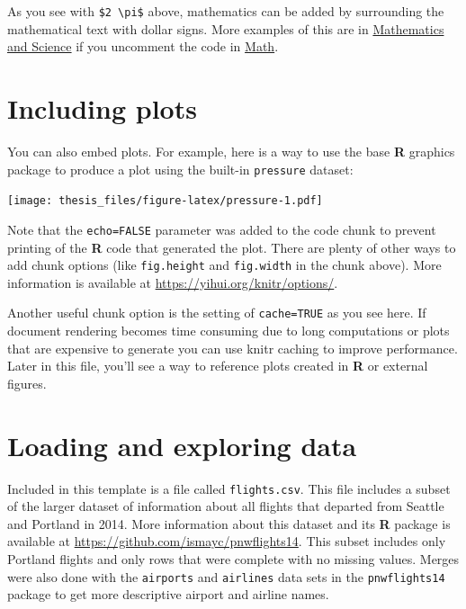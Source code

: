\documentclass[12pt,twoside]{reedthesis}
\begin{document}
As you see with \texttt{\$2\ \textbackslash{}pi\$} above, mathematics can be added by surrounding the mathematical text with dollar signs. More examples of this are in \protect\hyperlink{math-sci}{Mathematics and Science} if you uncomment the code in \protect\hyperlink{math}{Math}.

\hypertarget{including-plots}{%
\section{Including plots}\label{including-plots}}

You can also embed plots. For example, here is a way to use the base \textbf{R} graphics package to produce a plot using the built-in \texttt{pressure} dataset:

\texttt{[image: thesis\_files/figure-latex/pressure-1.pdf]}

Note that the \texttt{echo=FALSE} parameter was added to the code chunk to prevent printing of the \textbf{R} code that generated the plot. There are plenty of other ways to add chunk options (like \texttt{fig.height} and \texttt{fig.width} in the chunk above). More information is available at \url{https://yihui.org/knitr/options/}.

Another useful chunk option is the setting of \texttt{cache=TRUE} as you see here. If document rendering becomes time consuming due to long computations or plots that are expensive to generate you can use knitr caching to improve performance. Later in this file, you'll see a way to reference plots created in \textbf{R} or external figures.

\hypertarget{loading-and-exploring-data}{%
\section{Loading and exploring data}\label{loading-and-exploring-data}}

Included in this template is a file called \texttt{flights.csv}. This file includes a subset of the larger dataset of information about all flights that departed from Seattle and Portland in 2014. More information about this dataset and its \textbf{R} package is available at \url{https://github.com/ismayc/pnwflights14}. This subset includes only Portland flights and only rows that were complete with no missing values. Merges were also done with the \texttt{airports} and \texttt{airlines} data sets in the \texttt{pnwflights14} package to get more descriptive airport and airline names.
\end{document}
